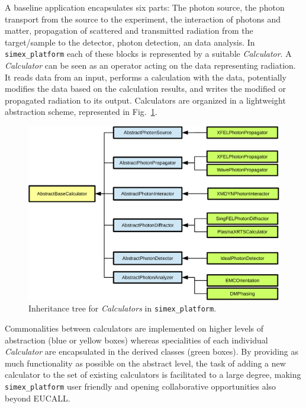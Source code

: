 \documentclass[12pt]{scrartcl}
\begin{document}
A baseline application encapsulates six parts:
The photon source, the photon transport from the source to the
experiment, the interaction of photons and matter, propagation of scattered and
transmitted radiation from the target/sample to the detector, photon
detection, an data analysis. In \texttt{simex\_platform}
each of these blocks is represented by a suitable \textit{Calculator}. A
\textit{Calculator} can be seen as an operator acting on the data representing
radiation. It reads data from an input, performs a calculation with the data,
potentially modifies the data based on the calculation results, and  writes the
modified or propagated radiation to its output. Calculators are organized in a
lightweight abstraction scheme, represented in Fig.~\ref{fig:simex_calculators_tree}.
\begin{figure}[ht]
  \begin{center}
    \includegraphics[width=1.0\textwidth,angle=0,clip]{calculators_inheritance-crop}
  \end{center}
  \caption{Inheritance tree for \textit{Calculators} in \texttt{simex\_platform}.}
  \label{fig:simex_calculators_tree}
\end{figure}

Commonalities between calculators are implemented on higher levels of
abstraction (blue or yellow boxes) whereas
specialities of each individual \textit{Calculator} are encapsulated in the
derived classes (green boxes). By providing as much functionality as possible on
the abstract level, the task of adding a new calculator to the set of existing
calculators is facilitated to a large degree, making \texttt{simex\_platform}
user friendly and opening collaborative opportunities also beyond EUCALL.
\end{document}

